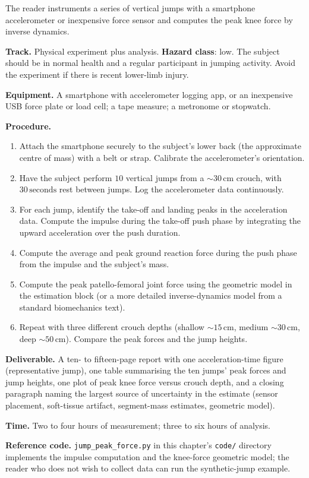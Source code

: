 \begin{project}
The reader instruments a series of vertical jumps with a smartphone
accelerometer or inexpensive force sensor and computes the peak knee
force by inverse dynamics.

\textbf{Track.} Physical experiment plus analysis.
\textbf{Hazard class}: low. The subject should be in normal health
and a regular participant in jumping activity. Avoid the experiment
if there is recent lower-limb injury.

\textbf{Equipment.} A smartphone with accelerometer logging app, or
an inexpensive USB force plate or load cell; a tape measure; a
metronome or stopwatch.

\textbf{Procedure.}

\begin{enumerate}[leftmargin=*]
\item Attach the smartphone securely to the subject's lower back
  (the approximate centre of mass) with a belt or strap. Calibrate
  the accelerometer's orientation.
\item Have the subject perform $10$ vertical jumps from a
  $\sim 30\,\text{cm}$ crouch, with $30\,\text{seconds}$ rest between
  jumps. Log the accelerometer data continuously.
\item For each jump, identify the take-off and landing peaks in the
  acceleration data. Compute the impulse during the take-off push
  phase by integrating the upward acceleration over the push duration.
\item Compute the average and peak ground reaction force during the
  push phase from the impulse and the subject's mass.
\item Compute the peak patello-femoral joint force using the
  geometric model in the estimation block (or a more detailed
  inverse-dynamics model from a standard biomechanics text).
\item Repeat with three different crouch depths (shallow $\sim 15\,\text{cm}$,
  medium $\sim 30\,\text{cm}$, deep $\sim 50\,\text{cm}$). Compare
  the peak forces and the jump heights.
\end{enumerate}

\textbf{Deliverable.} A ten- to fifteen-page report with one
acceleration-time figure (representative jump), one table summarising
the ten jumps' peak forces and jump heights, one plot of peak knee
force versus crouch depth, and a closing paragraph naming the largest
source of uncertainty in the estimate (sensor placement, soft-tissue
artifact, segment-mass estimates, geometric model).

\textbf{Time.} Two to four hours of measurement; three to six hours
of analysis.

\textbf{Reference code.} \texttt{jump\_peak\_force.py} in this
chapter's \texttt{code/} directory implements the impulse computation
and the knee-force geometric model; the reader who does not wish to
collect data can run the synthetic-jump example.
\end{project}


